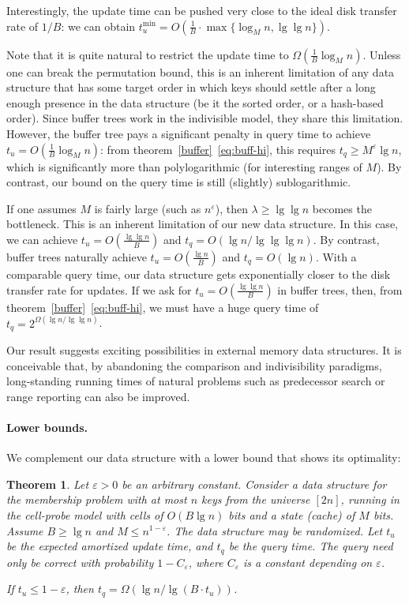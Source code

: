 \documentclass[letterpaper,11pt]{article}
\newtheorem{theorem}{Theorem}
\newcommand{\eps}{\varepsilon}
\begin{document}
Interestingly, the update time can be pushed very close to the ideal
disk transfer rate of $1/B$: we can obtain $t_u^{\min} = O(
\frac{1}{B} \cdot \max \{ \log_M n, \lg\lg n\})$.

Note that it is quite natural to restrict the update time to
$\Omega(\frac{1}{B} \log_M n)$. Unless one can break the permutation
bound, this is an inherent limitation of any data structure that has
some target order in which keys should settle after a long enough
presence in the data structure (be it the sorted order, or a
hash-based order). Since buffer trees work in the indivisible model,
they share this limitation. However, the buffer tree pays a
significant penalty in query time to achieve $t_u = O(\frac{1}{B}
\log_M n)$: from theorem~\ref{buffer}~\eqref{eq:buff-hi}, this requires $t_q \ge M^\eps \lg
n$, which is significantly more than polylogarithmic (for interesting
ranges of $M$). By contrast, our bound on the query time is still
(slightly) sublogarithmic.

If one assumes $M$ is fairly large (such as $n^\eps$), then $\lambda
\ge \lg\lg n$ becomes the bottleneck. This is an inherent limitation
of our new data structure. In this case, we can achieve $t_u =
O(\frac{\lg\lg n}{B})$ and $t_q = O(\lg n / \lg\lg\lg n)$. By
contrast, buffer trees naturally achieve $t_u = O(\frac{\lg n}{B})$
and $t_q = O(\lg n)$. With a comparable query time, our data structure
gets exponentially closer to the disk transfer rate for updates.
If we ask for $t_u = O(\frac{\lg\lg n}{B})$ in buffer trees, then, from
theorem~\ref{buffer}~\eqref{eq:buff-hi}, we must have a huge query time of $t_q =
2^{\Omega(\lg n / \lg\lg n)}$.

Our result suggests exciting possibilities in external memory data
structures. It is conceivable that, by abandoning the comparison and
indivisibility paradigms, long-standing running times of natural
problems such as predecessor search or range reporting can also be
improved.


\paragraph{Lower bounds.}
We complement our data structure with a lower bound that shows its
optimality:

\begin{theorem}
Let $\eps > 0$ be an arbitrary constant. Consider a data structure for
the membership problem with at most $n$ keys from the universe $[2n]$,
running in the cell-probe model with cells of $O(B\lg n)$ bits and a
state (cache) of $M$ bits. Assume $B\ge \lg n$ and $M \le
n^{1-\eps}$. The data structure may be randomized. Let $t_u$ be the
expected amortized update time, and $t_q$ be the query time. The query
need only be correct with probability $1- C_\eps$, where $C_\eps$ is
a constant depending on $\eps$.

If $t_u \le 1-\eps$, then $t_q = \Omega(\lg n / \lg(B\cdot t_u))$.
\end{theorem}
\end{document}
